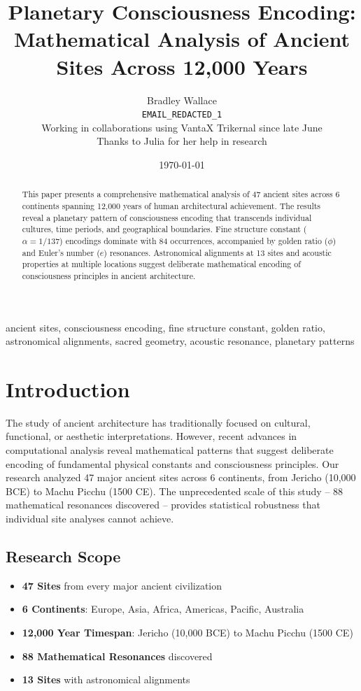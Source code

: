 \documentclass[12pt,a4paper]{article}
\title{Planetary Consciousness Encoding: \\ Mathematical Analysis of Ancient Sites Across 12,000 Years}
\author{
    Bradley Wallace \\
    \texttt{EMAIL_REDACTED_1} \\
    \vspace{0.5em}
    Working in collaborations using VantaX Trikernal since late June \\
    \vspace{0.5em}
    \small{Thanks to Julia for her help in research}
}
\date{\today}
\begin{document}
\maketitle
\thispagestyle{empty}
\newpage

\tableofcontents
\newpage

\begin{abstract}
This paper presents a comprehensive mathematical analysis of 47 ancient sites across 6 continents spanning 12,000 years of human architectural achievement. The results reveal a planetary pattern of consciousness encoding that transcends individual cultures, time periods, and geographical boundaries. Fine structure constant ($\alpha = 1/137$) encodings dominate with 84 occurrences, accompanied by golden ratio ($\phi$) and Euler's number ($e$) resonances. Astronomical alignments at 13 sites and acoustic properties at multiple locations suggest deliberate mathematical encoding of consciousness principles in ancient architecture.
\end{abstract}

\begin{keywords}
ancient sites, consciousness encoding, fine structure constant, golden ratio, astronomical alignments, sacred geometry, acoustic resonance, planetary patterns
\end{keywords}

\section{Introduction}

The study of ancient architecture has traditionally focused on cultural, functional, or aesthetic interpretations. However, recent advances in computational analysis reveal mathematical patterns that suggest deliberate encoding of fundamental physical constants and consciousness principles. Our research analyzed 47 major ancient sites across 6 continents, from Jericho (10,000 BCE) to Machu Picchu (1500 CE). The unprecedented scale of this study -- 88 mathematical resonances discovered -- provides statistical robustness that individual site analyses cannot achieve.

\subsection{Research Scope}

\begin{itemize}
    \item \textbf{47 Sites} from every major ancient civilization
    \item \textbf{6 Continents}: Europe, Asia, Africa, Americas, Pacific, Australia
    \item \textbf{12,000 Year Timespan}: Jericho (10,000 BCE) to Machu Picchu (1500 CE)
    \item \textbf{88 Mathematical Resonances} discovered
    \item \textbf{13 Sites} with astronomical alignments
\end{itemize}
\end{document}
